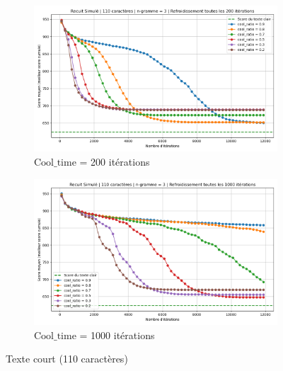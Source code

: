 \documentclass[a4paper]{article}
\begin{document}
\begin{figure}[H]
    \centering
    \begin{subfigure}[b]{0.49\textwidth}
        \includegraphics[width=\textwidth]{graphe_recuit_n_3_110_cool_time_200.png}
        \caption{\(\text{Cool\_time}\) = 200 itérations}
        \label{fig:n3-110-200}
    \end{subfigure}
    \hfill
    \begin{subfigure}[b]{0.49\textwidth}
        \includegraphics[width=\textwidth]{graphe_recuit_n_3_110_cool_time_1000.png}
        \caption{\(\text{Cool\_time}\) = 1000 itérations}
        \label{fig:n3-509-200}
    \end{subfigure}
    \caption{Texte court (110 caractères)}
    \label{fig:rs-n3-110}
\end{figure}
\end{document}
